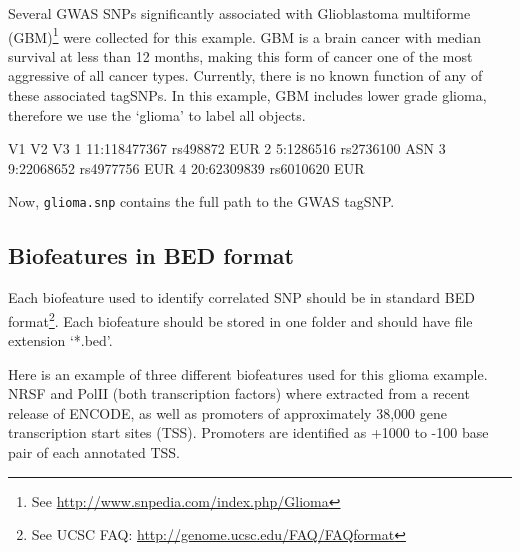 \documentclass[12pt,fullpage]{article}
\newcommand{\Robject}[1]{{\texttt{#1}}}
\begin{document}
Several GWAS SNPs significantly associated with Glioblastoma multiforme
(GBM)\footnote{See \url{http://www.snpedia.com/index.php/Glioma}} were collected
for this example. GBM is a brain cancer with median survival at less than 12
months, making this form of cancer one of the most aggressive of all cancer
types. Currently, there is no known function of any of these associated tagSNPs.
In this example, GBM includes lower grade glioma, therefore we use the `glioma'
to label all objects.

\begin{Schunk}
\begin{Soutput}
            V1        V2  V3
1 11:118477367  rs498872 EUR
2    5:1286516 rs2736100 ASN
3   9:22068652 rs4977756 EUR
4  20:62309839 rs6010620 EUR
\end{Soutput}
\end{Schunk}

Now, \Robject{glioma.snp} contains the full path to the GWAS tagSNP. 

\subsection{Biofeatures in BED format}

Each biofeature used to identify correlated SNP should be in standard BED
format\footnote{See UCSC FAQ: \url{http://genome.ucsc.edu/FAQ/FAQformat}}. Each
biofeature should be stored in one folder and should have file extension
`*.bed'.

Here is an example of three different biofeatures used for this glioma example.
NRSF and PolII (both transcription factors) where extracted from a recent
release of ENCODE, as well as promoters of approximately 38,000 gene
transcription start sites (TSS). Promoters are identified as +1000 to -100 base
pair of each annotated TSS.
\end{document}
